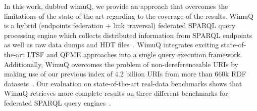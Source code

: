 


In this work, dubbed \ac{wimuQ}, we provide an approach that overcomes the limitations of the state of the art regarding to the coverage of the results. WimuQ is a hybrid (endpoints federation + link traversal) federated SPARQL query processing engine which collects distributed information from SPARQL endpoints as well as raw data dumps and HDT files~\cite{j.websem328}. WimuQ integrates exciting state-of-the-art LTSF and QFME approaches into a single query execution framework.   Additionally, WimuQ overcomes the problem of non-dereferenceable URIs by making use of our previous index of 4.2 billion URIs from more than 660k RDF datasets~\cite{valdestilhas2018my}. Our evaluation on state-of-the-art real-data benchmarks shows that WimuQ retrieves more complete results on three different benchmarks for federated SPARQL query engines~\cite{fedbench2011,feasible2015,saleem2018largerdfbench}. 





